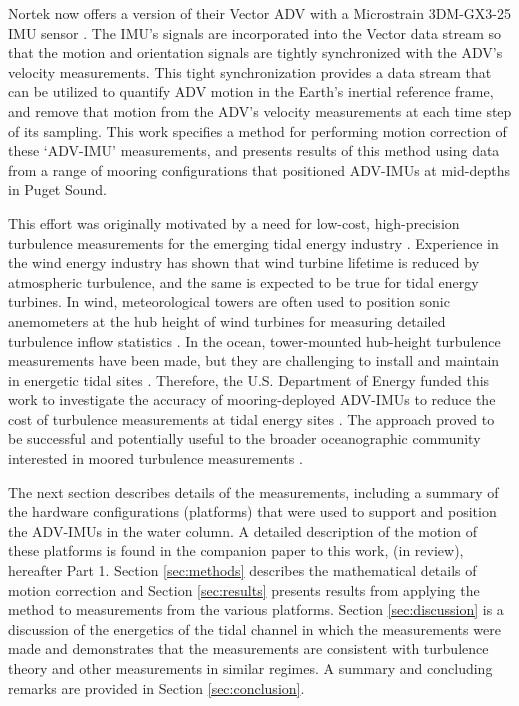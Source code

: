 Nortek now offers a version of their Vector ADV with a Microstrain 3DM-GX3-25 IMU sensor \cite[]{vector_manual2005, MicroStrain2012a}. The IMU's signals are incorporated into the Vector data stream so that the motion and orientation signals are tightly synchronized with the ADV's velocity measurements. This tight synchronization provides a data stream that can be utilized to quantify ADV motion in the Earth's inertial reference frame, and remove that motion from the ADV's velocity measurements at each time step of its sampling. This work specifies a method for performing motion correction of these `ADV-IMU' measurements, and presents results of this method using data from a range of mooring configurations that positioned ADV-IMUs at mid-depths in Puget Sound. 

This effort was originally motivated by a need for low-cost, high-precision turbulence measurements for the emerging tidal energy industry \cite[]{Mccaffrey++2015, Alexander+Hamlington2015}. Experience in the wind energy industry has shown that wind turbine lifetime is reduced by atmospheric turbulence, and the same is expected to be true for tidal energy turbines. In wind, meteorological towers are often used to position sonic anemometers at the hub height of wind turbines for measuring detailed turbulence inflow statistics \cite[]{Hand++2003, Kelley++2005, Mucke++2011, Afgan++2013}. In the ocean, tower-mounted hub-height turbulence measurements have been made, but they are challenging to install and maintain in energetic tidal sites \cite[]{Gunawan++2014,Thomson++2012}. Therefore, the U.S. Department of Energy funded this work to investigate the accuracy of mooring-deployed ADV-IMUs to reduce the cost of turbulence measurements at tidal energy sites \cite[]{Kilcher++2016}. The approach proved to be successful and potentially useful to the broader oceanographic community interested in moored turbulence measurements \cite[]{Lueck+Huang1999, Doherty++1999, Nash++2004, Moum+Nash2009b, Alford2010, Paskyabi+Fer2013}.

The next section describes details of the measurements, including a summary of the hardware configurations (platforms) that were used to support and position the ADV-IMUs in the water column. A detailed description of the motion of these platforms is found in the companion paper to this work, \citeauthor{Harding++2017} (in review), hereafter Part 1. Section \ref{sec:methods} describes the mathematical details of motion correction and Section \ref{sec:results} presents results from applying the method to measurements from the various platforms. Section \ref{sec:discussion} is a discussion of the energetics of the tidal channel in which the measurements were made and demonstrates that the measurements are consistent with turbulence theory and other measurements in similar regimes. A summary and concluding remarks are provided in Section \ref{sec:conclusion}.


